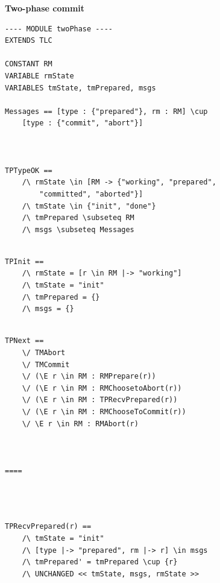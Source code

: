 \documentclass{beamer}
\begin{document}
\begin{frame}
    \begin{center}
        \LARGE{\textbf{Two-phase commit}}
    \end{center}
\end{frame}

\begin{frame}[fragile]
    \begin{lstlisting}
---- MODULE twoPhase ----
EXTENDS TLC

CONSTANT RM 
VARIABLE rmState 
VARIABLES tmState, tmPrepared, msgs 

Messages == [type : {"prepared"}, rm : RM] \cup 
    [type : {"commit", "abort"}]



TPTypeOK == 
    /\ rmState \in [RM -> {"working", "prepared", 
        "committed", "aborted"}]
    /\ tmState \in {"init", "done"}
    /\ tmPrepared \subseteq RM
    /\ msgs \subseteq Messages


    \end{lstlisting}
\end{frame}

\begin{frame}[fragile]
    \begin{lstlisting}
TPInit == 
    /\ rmState = [r \in RM |-> "working"]
    /\ tmState = "init"
    /\ tmPrepared = {}
    /\ msgs = {}

    \end{lstlisting}
\end{frame}



\begin{frame}[fragile]
    \begin{lstlisting}

TPNext ==
    \/ TMAbort
    \/ TMCommit
    \/ (\E r \in RM : RMPrepare(r))
    \/ (\E r \in RM : RMChoosetoAbort(r))
    \/ (\E r \in RM : TPRecvPrepared(r))
    \/ (\E r \in RM : RMChooseToCommit(r))
    \/ \E r \in RM : RMAbort(r)



====
    \end{lstlisting}


\end{frame}


\begin{frame}[fragile]
    \begin{lstlisting}



TPRecvPrepared(r) == 
    /\ tmState = "init"
    /\ [type |-> "prepared", rm |-> r] \in msgs
    /\ tmPrepared' = tmPrepared \cup {r}
    /\ UNCHANGED << tmState, msgs, rmState >>
        
    \end{lstlisting}


\end{frame}
\end{document}

